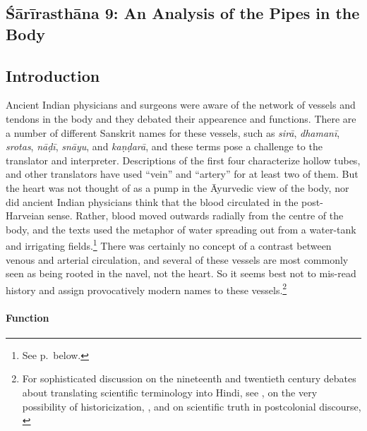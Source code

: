 \begin{refsection} 
\chapter{Śārīrasthāna 9:  An Analysis of the Pipes in the Body}

\setcounter{footnote}{0}
\label{dhamanī}
\section{Introduction}

%
%
%
%
%
%

Ancient Indian physicians and surgeons were aware of the network of
vessels and tendons in the body and they debated their appearence and
functions. There are a number of different Sanskrit names for these
vessels, such as \emph{sirā}, \emph{dhamanī}, \emph{srotas},
\emph{nāḍī}, \emph{snāyu}, and \emph{kaṇḍarā}, and these terms pose a
challenge to the translator and interpreter.  Descriptions of the
first four characterize hollow tubes, and other translators have used
“vein” and “artery” for at least two of them.  But the heart was not
thought of as a pump in the Āyurvedic view of the body, nor did
ancient Indian physicians think that the blood circulated in the
post-Harveian sense. Rather, blood moved outwards radially from the
centre of the body, and the texts used the metaphor of water spreading out from a water-tank and irrigating fields.\footnote{See p.\,\pageref{fields} below.} 
There was certainly no concept of a contrast between venous and
arterial circulation, and several of these vessels are most commonly
seen as being rooted in the navel, not the heart.  So it seems best
not to mis-read history and assign provocatively modern names to these vessels.\footnote{For sophisticated discussion on the nineteenth and twentieth century debates about translating scientific terminology into Hindi, see \cite{sing-2021,gure-2020,gure-2022}, on the very possibility of historicization, \cite{mukh-2020}, and on scientific truth in  postcolonial discourse, \cite{gure-2020}}

\subsubsection{Function}


\end{refsection}
